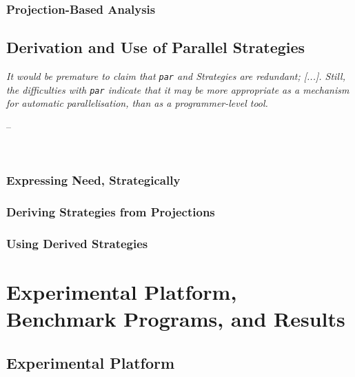 \documentclass[openright, dottedtoc, headinclude, footinclude=true, a4paper, numbers=noenddot]{scrreprt}
\makeatletter
\newenvironment{chapquote}[2][2em]
  {\setlength{\@tempdima}{#1}%
   \def\chapquote@author{#2}%
   \parshape 1 \@tempdima \dimexpr\textwidth-2\@tempdima\relax%
   \itshape}
  {\par\normalfont\hfill--\ \chapquote@author\hspace*{\@tempdima}\par\noindent\hrulefill\\[1cm]}
\makeatother
\begin{document}
        \section{Projection-Based Analysis}
        \label{sec:projections}
        


    \chapter{Derivation and Use of Parallel Strategies}
    \label{chap:derivation}
    \begin{chapquote}{\cite{marlow2011monad}}
    It would be premature to claim that \verb'par' and Strategies are redundant;
    [...]. Still, the difficulties with \verb'par' indicate that it may be more
    appropriate as a mechanism for automatic parallelisation, than as a
    programmer-level tool.
    \end{chapquote}
    

        \section{Expressing Need, Strategically}
        \label{sec:expressingNeed}
        

        \section{Deriving Strategies from Projections}
        \label{sec:derivation}
        


        \section{Using Derived Strategies}
        \label{sec:parPlacement}
        
    
    
\part{Experimental Platform, Benchmark Programs, and Results}
\label{part:implementation}

    \chapter{Experimental Platform} 
    \label{chap:platform}
    
    
\end{document}
